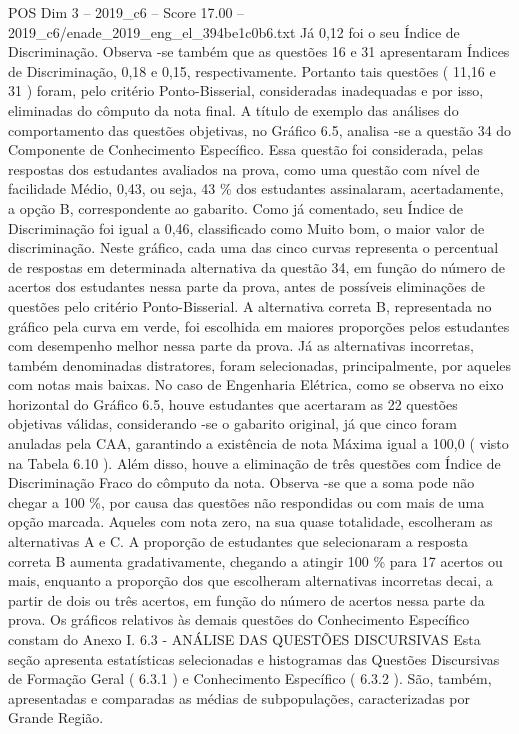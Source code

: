 \begin{textsample}{POS Dim 3 – 2019\_c6 – Score 17.00 – 2019\_c6/enade\_2019\_eng\_el\_394be1c0b6.txt}
Já 0,12 foi o seu Índice de Discriminação.
Observa -se também que as questões 16 e 31 apresentaram Índices de Discriminação, 0,18 e 0,15, respectivamente.
Portanto tais questões ( 11,16 e 31 ) foram, pelo critério Ponto-Bisserial, consideradas inadequadas e por isso, eliminadas do cômputo da nota final.
A título de exemplo das análises do comportamento das questões objetivas, no Gráfico 6.5, analisa -se a questão 34 do Componente de Conhecimento Específico.
Essa questão foi considerada, pelas respostas dos estudantes avaliados na prova, como uma questão com nível de facilidade Médio, 0,43, ou seja, 43 \% dos estudantes assinalaram, acertadamente, a opção B, correspondente ao gabarito.
Como já comentado, seu Índice de Discriminação foi igual a 0,46, classificado como Muito bom, o maior valor de discriminação.
Neste gráfico, cada uma das cinco curvas representa o percentual de respostas em determinada alternativa da questão 34, em função do número de acertos dos estudantes nessa parte da prova, antes de possíveis eliminações de questões pelo critério Ponto-Bisserial.
A alternativa correta B, representada no gráfico pela curva em verde, foi escolhida em maiores proporções pelos estudantes com desempenho melhor nessa parte da prova.
Já as alternativas incorretas, também denominadas distratores, foram selecionadas, principalmente, por aqueles com notas mais baixas.
No caso de Engenharia Elétrica, como se observa no eixo horizontal do Gráfico 6.5, houve estudantes que acertaram as 22 questões objetivas válidas, considerando -se o gabarito original, já que cinco foram anuladas pela CAA, garantindo a existência de nota Máxima igual a 100,0 ( visto na Tabela 6.10 ).
Além disso, houve a eliminação de três questões com Índice de Discriminação Fraco do cômputo da nota.
Observa -se que a soma pode não chegar a 100 \%, por causa das questões não respondidas ou com mais de uma opção marcada.
Aqueles com nota zero, na sua quase totalidade, escolheram as alternativas A e C.
A proporção de estudantes que selecionaram a resposta correta B aumenta gradativamente, chegando a atingir 100 \% para 17 acertos ou mais, enquanto a proporção dos que escolheram alternativas incorretas decai, a partir de dois ou três acertos, em função do número de acertos nessa parte da prova.
Os gráficos relativos às demais questões do Conhecimento Específico constam do Anexo I. 6.3 - ANÁLISE DAS QUESTÕES DISCURSIVAS Esta seção apresenta estatísticas selecionadas e histogramas das Questões Discursivas de Formação Geral ( 6.3.1 ) e Conhecimento Específico ( 6.3.2 ).
São, também, apresentadas e comparadas as médias de subpopulações, caracterizadas por Grande Região.

\end{textsample}
